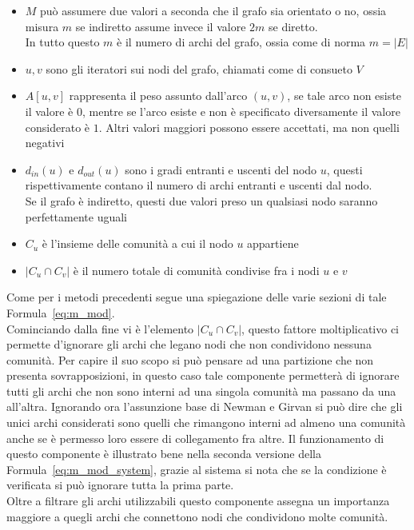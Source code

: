 \begin{itemize}
	\item $M$ può assumere due valori a seconda che il grafo sia orientato o no, ossia misura $m$ se indiretto assume invece il valore $2m$ se diretto.\\
	In tutto questo $m$ è il numero di archi del grafo, ossia come di norma $m=|E|$
	\item $u,v$ sono gli iteratori sui nodi del grafo, chiamati come di consueto $V$
	\item $A \left[ u,v \right]$ rappresenta il peso assunto dall'arco $(u, v)$, se tale arco non esiste il valore è $0$, mentre se l'arco esiste e non è specificato diversamente il valore considerato è $1$. Altri valori maggiori possono essere accettati, ma non quelli negativi
	\item $d_{in}\left(u\right)$ e $d_{out}\left(u\right)$ sono i gradi entranti e uscenti del nodo $u$, questi rispettivamente contano il numero di archi entranti e uscenti dal nodo.\\
	Se il grafo è indiretto, questi due valori preso un qualsiasi nodo saranno perfettamente uguali
	\item $C_u$ è l'insieme delle comunità a cui il nodo $u$ appartiene
	\item $|C_u \cap C_v|$ è il numero totale di comunità condivise fra i nodi $u$ e $v$
\end{itemize}
%
Come per i metodi precedenti segue una spiegazione delle varie sezioni di tale Formula~\ref{eq:m_mod}.\\
Cominciando dalla fine vi è l'elemento $\displaystyle |C_u \cap C_v|$, questo fattore moltiplicativo ci permette d'ignorare gli archi che legano nodi che non condividono nessuna comunità. Per capire il suo scopo si può pensare ad una partizione che non presenta sovrapposizioni, in questo caso tale componente permetterà di ignorare tutti gli archi che non sono interni ad una singola comunità ma passano da una all'altra. Ignorando ora l'assunzione base di Newman e Girvan  si può dire che gli unici archi considerati sono quelli che rimangono interni ad almeno una comunità anche se è permesso loro essere di collegamento fra altre. Il funzionamento di questo componente è illustrato bene nella seconda versione della Formula~\ref{eq:m_mod_system}, grazie al sistema si nota che se la condizione è verificata si può ignorare tutta la prima parte.\\
Oltre a filtrare gli archi utilizzabili questo componente assegna un importanza maggiore a quegli archi che connettono nodi che condividono molte comunità.

